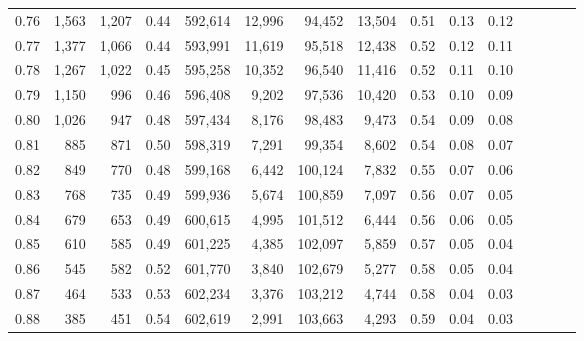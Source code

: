 \begin{tabular}{rrrcrrrrrrrrrrr}
0.76 &   1,563 &  1,207 &                                       0.44 &  592,614 &   12,996 &   94,452 &   13,504 &  0.51 &  0.13 &                         0.12 \\
0.77 &   1,377 &  1,066 &                                       0.44 &  593,991 &   11,619 &   95,518 &   12,438 &  0.52 &  0.12 &                         0.11 \\
0.78 &   1,267 &  1,022 &                                       0.45 &  595,258 &   10,352 &   96,540 &   11,416 &  0.52 &  0.11 &                         0.10 \\
0.79 &   1,150 &    996 &                                       0.46 &  596,408 &    9,202 &   97,536 &   10,420 &  0.53 &  0.10 &                         0.09 \\
0.80 &   1,026 &    947 &                                       0.48 &  597,434 &    8,176 &   98,483 &    9,473 &  0.54 &  0.09 &                         0.08 \\
0.81 &     885 &    871 &                                       0.50 &  598,319 &    7,291 &   99,354 &    8,602 &  0.54 &  0.08 &                         0.07 \\
0.82 &     849 &    770 &                                       0.48 &  599,168 &    6,442 &  100,124 &    7,832 &  0.55 &  0.07 &                         0.06 \\
0.83 &     768 &    735 &                                       0.49 &  599,936 &    5,674 &  100,859 &    7,097 &  0.56 &  0.07 &                         0.05 \\
0.84 &     679 &    653 &                                       0.49 &  600,615 &    4,995 &  101,512 &    6,444 &  0.56 &  0.06 &                         0.05 \\
0.85 &     610 &    585 &                                       0.49 &  601,225 &    4,385 &  102,097 &    5,859 &  0.57 &  0.05 &                         0.04 \\
0.86 &     545 &    582 &                                       0.52 &  601,770 &    3,840 &  102,679 &    5,277 &  0.58 &  0.05 &                         0.04 \\
0.87 &     464 &    533 &                                       0.53 &  602,234 &    3,376 &  103,212 &    4,744 &  0.58 &  0.04 &                         0.03 \\
0.88 &     385 &    451 &                                       0.54 &  602,619 &    2,991 &  103,663 &    4,293 &  0.59 &  0.04 &                         0.03 \\

\end{tabular}

